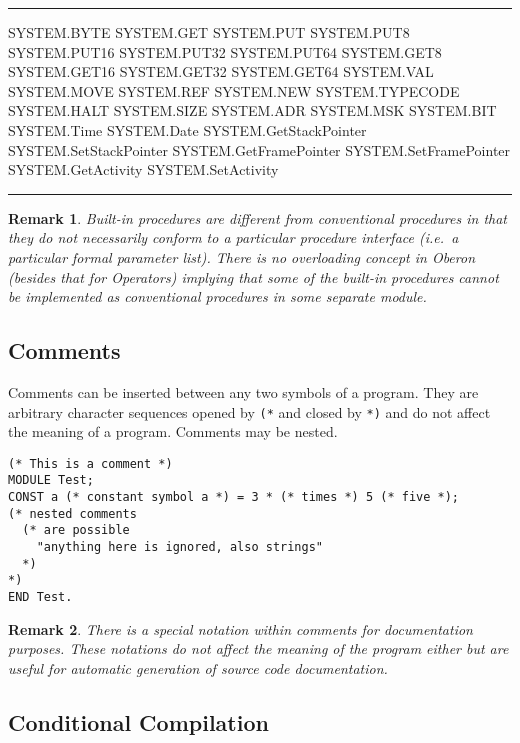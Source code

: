 \documentclass[a4wide,11pt]{article}
\newtheorem{remark}{Remark}
\newcommand{\srcfont}{\usefont{T1}{lmtt}{b}{n}}
\newenvironment{codebox}{%
\par
\begin{minipage}{\linewidth}
\hrule\vspace{0.1cm}
}{
\vspace{0.1cm}
\hrule
\end{minipage}
}
\begin{document}
\begin{codebox}
\srcfont
SYSTEM.BYTE
SYSTEM.GET
SYSTEM.PUT
SYSTEM.PUT8
SYSTEM.PUT16
SYSTEM.PUT32
SYSTEM.PUT64
SYSTEM.GET8
SYSTEM.GET16
SYSTEM.GET32
SYSTEM.GET64
SYSTEM.VAL
SYSTEM.MOVE
SYSTEM.REF
SYSTEM.NEW
SYSTEM.TYPECODE
SYSTEM.HALT
SYSTEM.SIZE
SYSTEM.ADR
SYSTEM.MSK
SYSTEM.BIT
SYSTEM.Time
SYSTEM.Date
SYSTEM.GetStackPointer
SYSTEM.SetStackPointer
SYSTEM.GetFramePointer
SYSTEM.SetFramePointer
SYSTEM.GetActivity
SYSTEM.SetActivity
\end{codebox}

\begin{remark}
Built-in procedures are different from conventional procedures in that they do not necessarily conform to a particular procedure interface (i.e.\ a particular formal parameter list).
There is no overloading concept in Oberon (besides that for Operators) implying that some of the built-in procedures cannot be implemented as conventional procedures in some separate module.
\end{remark}

\subsection{Comments}
Comments can be inserted between any two symbols of a program.
They are arbitrary character sequences opened by \lstinline"(*" and closed by \lstinline"*)" and do not affect the meaning of a program.
Comments may be nested.

\begin{annotation}
\begin{lstlisting}[style=example,caption=Examples of comments]
(* This is a comment *)
MODULE Test;
CONST a (* constant symbol a *) = 3 * (* times *) 5 (* five *);
(* nested comments
  (* are possible
    "anything here is ignored, also strings"
  *)
*)
END Test.
\end{lstlisting}
\end{annotation}

\begin{annotation}
\begin{remark}
There is a special notation within comments for documentation purposes.
These notations do not affect the meaning of the program either but are useful for automatic generation of source code documentation.
\end{remark}
\end{annotation}

\subsection{Conditional Compilation}
\end{document}
